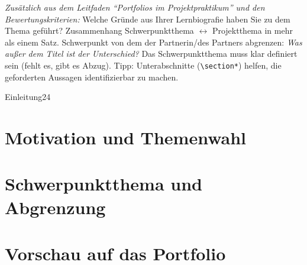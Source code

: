 \begin{hinweise}
\smallskip\emph{Zusätzlich aus dem Leitfaden \enquote{Portfolios im Projektpraktikum} und den Bewertungskriterien:}
Welche Gründe aus Ihrer Lernbiografie haben Sie zu dem Thema geführt? Zusammenhang Schwerpunktthema
\(\leftrightarrow\) Projektthema in mehr als einem Satz. Schwerpunkt von dem der Partnerin/des Partners abgrenzen:
\emph{Was außer dem Titel ist der Unterschied?} Das Schwerpunktthema muss klar definiert sein (fehlt es, gibt es Abzug).
Tipp: Unterabschnitte (\texttt{\textbackslash section*}) helfen, die geforderten Aussagen identifizierbar zu machen.
\end{hinweise}

\begin{umfang}{Einleitung}{2}{4}

\section*{Motivation und Themenwahl}

\section*{Schwerpunktthema und Abgrenzung}

\section*{Vorschau auf das Portfolio}

\end{umfang}
